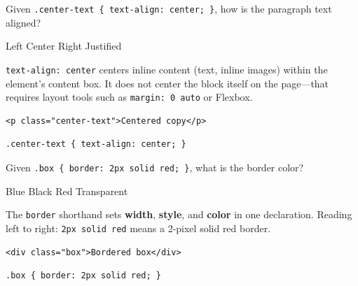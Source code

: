 \question[4]
Given \texttt{.center-text \{ text-align: center; \}}, how is the paragraph text aligned?
\begin{choices}
  \choice Left
  \CorrectChoice Center
  \choice Right
  \choice Justified
\end{choices}
\begin{solution}
  \texttt{text-align: center} centers inline content (text, inline images) within the element's content box. It does not center the block itself on the page---that requires layout tools such as \texttt{margin: 0 auto} or Flexbox.
\begin{lstlisting}[style=htmlinline]
<p class="center-text">Centered copy</p>
\end{lstlisting}
\begin{lstlisting}[style=cssinline]
.center-text { text-align: center; }
\end{lstlisting}
\end{solution}

\question[4]
Given \texttt{.box \{ border: 2px solid red; \}}, what is the border color?
\begin{choices}
  \choice Blue
  \choice Black
  \CorrectChoice Red
  \choice Transparent
\end{choices}
\begin{solution}
  The \texttt{border} shorthand sets \textbf{width}, \textbf{style}, and \textbf{color} in one declaration. Reading left to right: \texttt{2px solid red} means a 2-pixel solid red border.
\begin{lstlisting}[style=htmlinline]
<div class="box">Bordered box</div>
\end{lstlisting}
\begin{lstlisting}[style=cssinline]
.box { border: 2px solid red; }
\end{lstlisting}
\end{solution}

